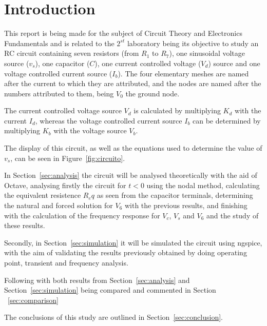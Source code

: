 \section{Introduction}
\label{sec:introduction}


\hspace{0,5cm} This report is being made for the subject of Circuit Theory and Electronics Fundamentals and is related to the $2^{st}$ laboratory being its objective to study an RC circuit containing seven resistors (from $R_1$ to $R_7$), one sinusoidal voltage source ($v_s$), one capacitor ($C$), one current controlled voltage ($V_d$) source and one voltage controlled current source ($I_b$). The four elementary meshes are named after the current to which they are attributed, and the nodes are named after the numbers attributed to them, being $V_0$ the ground node.

The current controlled voltage source $V_d$ is calculated by multiplying $K_d$ with the current $I_d$, whereas the voltage controlled current source $I_b$ can be determined by multiplying $K_b$ with the voltage source $V_b$.

The display of this circuit, as well as the equations used to determine the value of $v_s$, can be seen in Figure~\ref{fig:circuito}.

In Section~\ref{sec:analysis} the circuit will be analysed theoretically with the aid of Octave, analysing firstly the circuit for $t<0$ using the nodal method, calculating the equivalent resistence $R_eq$ as seen from the capacitor terminals, determining the natural and forced solution for $V_6$ with the previous results, and finishing with the calculation of the frequency response for $V_c$, $V_s$ and $V_6$ and the study of these results.

Secondly, in Section~\ref{sec:simulation} it will be simulated the circuit using ngspice, with the aim of validating the results previously obtained by doing operating point, transient and frequency analysis.

Following with both results from Section~\ref{sec:analysis} and Section~\ref{sec:simulation} being compared and commented in Section ~\ref{sec:comparison}

The conclusions of this study are outlined in Section~\ref{sec:conclusion}.


